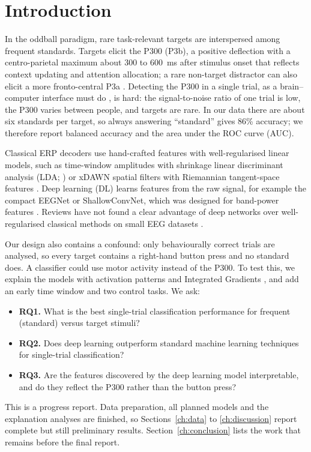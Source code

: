\section{Introduction}
\label{ch:intro}

In the oddball paradigm, rare task-relevant targets are interspersed among frequent standards. Targets elicit the P300 (P3b), a positive deflection with a centro-parietal maximum about 300 to 600~ms after stimulus onset that reflects context updating and attention allocation; a rare non-target distractor can also elicit a more fronto-central P3a \citep{polich2007}. Detecting the P300 in a single trial, as a brain--computer interface must do \citep{farwell1988}, is hard: the signal-to-noise ratio of one trial is low, the P300 varies between people, and targets are rare. In our data there are about six standards per target, so always answering ``standard'' gives 86\% accuracy; we therefore report balanced accuracy and the area under the ROC curve (AUC).

Classical ERP decoders use hand-crafted features with well-regularised linear models, such as time-window amplitudes with shrinkage linear discriminant analysis (LDA; \citealp{blankertz2011}) or xDAWN spatial filters with Riemannian tangent-space features \citep{rivet2009,barachant2012}. Deep learning (DL) learns features from the raw signal, for example the compact EEGNet \citep{lawhern2018} or ShallowConvNet, which was designed for band-power features \citep{schirrmeister2017}. Reviews have not found a clear advantage of deep networks over well-regularised classical methods on small EEG datasets \citep{lotte2018,roy2019}.

Our design also contains a confound: only behaviourally correct trials are analysed, so every target contains a right-hand button press and no standard does. A classifier could use motor activity instead of the P300. To test this, we explain the models with activation patterns \citep{haufe2014} and Integrated Gradients \citep{sundararajan2017}, and add an early time window and two control tasks. We ask:
\begin{itemize}
  \item \textbf{RQ1.} What is the best single-trial classification performance for frequent (standard) versus target stimuli?
  \item \textbf{RQ2.} Does deep learning outperform standard machine learning techniques for single-trial classification?
  \item \textbf{RQ3.} Are the features discovered by the deep learning model interpretable, and do they reflect the P300 rather than the button press?
\end{itemize}

This is a progress report. Data preparation, all planned models and the explanation analyses are finished, so Sections~\ref{ch:data} to \ref{ch:discussion} report complete but still preliminary results. Section~\ref{ch:conclusion} lists the work that remains before the final report.

